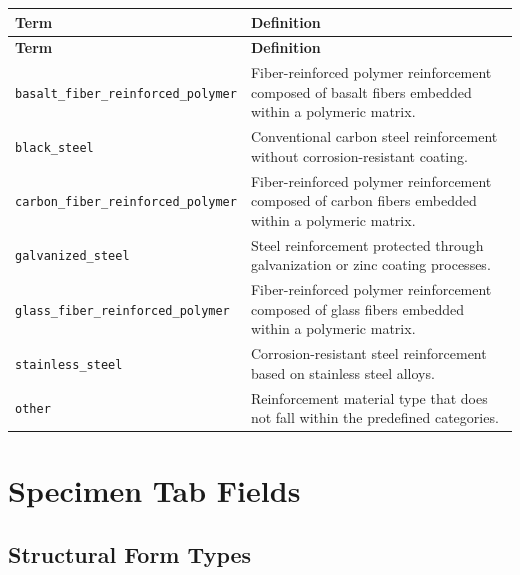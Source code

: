 \documentclass[11pt]{book}
\begin{document}
{\begin{longtable}{p{}p{}}
\hline
\textbf{Term} & \textbf{Definition} \\
\hline
\endfirsthead

\hline
\textbf{Term} & \textbf{Definition} \\
\hline
\endhead

\texttt{basalt\_fiber\_reinforced\_polymer} &
Fiber-reinforced polymer reinforcement composed of basalt fibers embedded within a polymeric matrix. \\

\texttt{black\_steel} &
Conventional carbon steel reinforcement without corrosion-resistant coating. \\

\texttt{carbon\_fiber\_reinforced\_polymer} &
Fiber-reinforced polymer reinforcement composed of carbon fibers embedded within a polymeric matrix. \\

\texttt{galvanized\_steel} &
Steel reinforcement protected through galvanization or zinc coating processes. \\

\texttt{glass\_fiber\_reinforced\_polymer} &
Fiber-reinforced polymer reinforcement composed of glass fibers embedded within a polymeric matrix. \\

\texttt{stainless\_steel} &
Corrosion-resistant steel reinforcement based on stainless steel alloys. \\

\texttt{other} &
Reinforcement material type that does not fall within the predefined categories. \\

\hline
\end{longtable}



\section{Specimen Tab Fields}
\label{vocab:specimen_fields_tab}

\subsection{Structural Form Types}
\label{vocab:structural_form_type_list}

}
\end{document}
